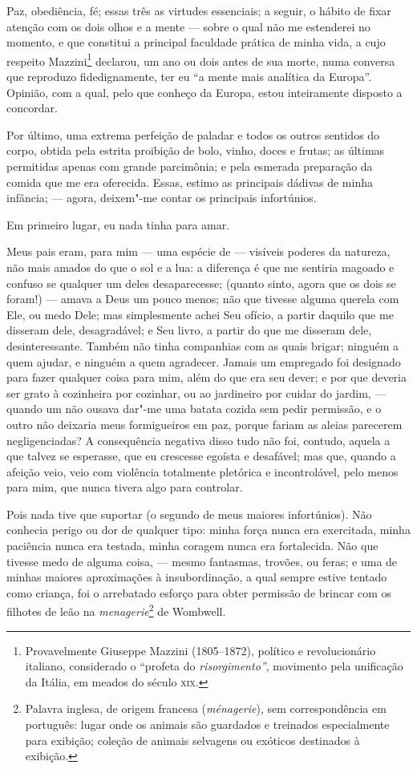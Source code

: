 Paz, obediência, fé; essas três as virtudes essenciais; a seguir, o
hábito de fixar atenção com os dois olhos e a mente --- sobre o qual não
me estenderei no momento, e que constitui a principal faculdade prática
de minha vida, a cujo respeito Mazzini\footnote{Provavelmente Giuseppe
  Mazzini (1805--1872), político e revolucionário italiano,
  considerado o ``profeta do \textit{risorgimento''}, movimento pela
  unificação da Itália, em meados do século \textsc{xix}.} declarou,
um ano ou dois antes de sua morte, numa conversa que reproduzo
fidedignamente, ter eu ``a mente mais analítica da Europa''. Opinião,
com a qual, pelo que conheço da Europa, estou inteiramente disposto a
concordar.

Por último, uma extrema perfeição de paladar e todos os outros sentidos
do corpo, obtida pela estrita proibição de bolo, vinho, doces e frutas;
as últimas permitidas apenas com grande parcimônia; e pela esmerada
preparação da comida que me era oferecida. Essas, estimo as principais
dádivas de minha infância; --- agora, deixem"-me contar os principais
infortúnios.

Em primeiro lugar, eu nada tinha para amar.

Meus pais eram, para mim --- uma espécie de --- visíveis poderes da
natureza, não mais amados do que o sol e a lua: a diferença é que me
sentiria magoado e confuso se qualquer um deles desaparecesse; (quanto
sinto, agora que os dois se foram!) --- amava a Deus um pouco menos; não
que tivesse alguma querela com Ele, ou medo Dele; mas simplesmente achei
Seu ofício, a partir daquilo que me disseram dele, desagradável; e Seu
livro, a partir do que me disseram dele, desinteressante. Também não
tinha companhias com as quais brigar; ninguém a quem ajudar, e ninguém a
quem agradecer. Jamais um empregado foi designado para fazer qualquer
coisa para mim, além do que era seu dever; e por que deveria ser grato à
cozinheira por cozinhar, ou ao jardineiro por cuidar do jardim, ---
quando um não ousava dar"-me uma batata cozida sem pedir permissão, e o
outro não deixaria meus formigueiros em paz, porque fariam as aleias
parecerem negligenciadas? A consequência negativa disso tudo não foi,
contudo, aquela a que talvez se esperasse, que eu crescesse egoísta e
desafável; mas que, quando a afeição veio, veio com violência totalmente
pletórica e incontrolável, pelo menos para mim, que nunca tivera algo
para controlar.

Pois nada tive que suportar (o segundo de meus maiores infortúnios).
Não conhecia perigo ou dor de qualquer tipo: minha força nunca era
exercitada, minha paciência nunca era testada, minha coragem nunca era
fortalecida. Não que tivesse medo de alguma coisa, --- mesmo fantasmas,
trovões, ou feras; e uma de minhas maiores aproximações à
insubordinação, a qual sempre estive tentado como criança, foi o
arrebatado esforço para obter permissão de brincar com os filhotes de
leão na \textit{menagerie}\footnote{Palavra inglesa, de origem francesa
  (\textit{ménagerie}), sem correspondência em português: lugar onde os
  animais são guardados e treinados especialmente para exibição; coleção
  de animais selvagens ou exóticos destinados à exibição.}
de Wombwell.

